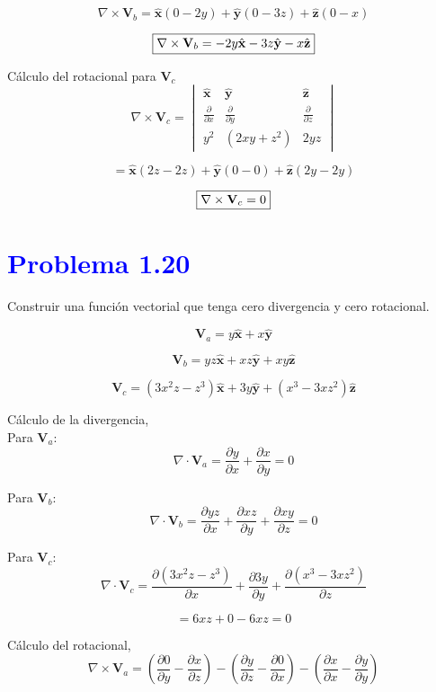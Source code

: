\documentclass[12pt]{article}
\newcommand{\question}[1]{\textcolor{blue}{\textbf{#1}}}
\begin{document}
\[
\nabla \times \mathbf{V}_b =
\hat{\mathbf{x}} (0 - 2y) +
\hat{\mathbf{y}} (0 - 3z) +
\hat{\mathbf{z}} (0 - x)
\]

\[\fbox{$
\nabla \times \mathbf{V}_b = -2y \hat{\mathbf{x}} - 3z \hat{\mathbf{y}} - x \hat{\mathbf{z}}$}
\]

Cálculo del rotacional para $\mathbf{V}_c$
\[
\nabla \times \mathbf{V}_c =
\begin{vmatrix}
\hat{\mathbf{x}} & \hat{\mathbf{y}} & \hat{\mathbf{z}} \\
\frac{\partial}{\partial x} & \frac{\partial}{\partial y} & \frac{\partial}{\partial z} \\
y^2 & (2xy+z^2) & 2yz
\end{vmatrix}
\]

\[
= \hat{\mathbf{x}} (2z - 2z) + \hat{\mathbf{y}} (0 - 0) + \hat{\mathbf{z}} (2y - 2y) \]

\[\fbox{$
\nabla \times \mathbf{V}_c=0$}
\]

\section*{ \question{Problema 1.20}}  Construir una función vectorial que tenga cero divergencia y cero rotacional.

\[
\mathbf{V}_a = y \hat{\mathbf{x}} + x \hat{\mathbf{y}}
\]

\[
\mathbf{V}_b = yz \hat{\mathbf{x}} + xz \hat{\mathbf{y}} + xy \hat{\mathbf{z}}
\]

\[
\mathbf{V}_c = (3x^2z - z^3) \hat{\mathbf{x}} + 3y \hat{\mathbf{y}} + (x^3 - 3xz^2) \hat{\mathbf{z}}
\]

Cálculo de la divergencia,\\

Para $\mathbf{V}_a$:
\[
\nabla \cdot \mathbf{V}_a = \frac{\partial y}{\partial x} + \frac{\partial x}{\partial y}  = 0
\]

Para $\mathbf{V}_b$:
\[
\nabla \cdot \mathbf{V}_b = \frac{\partial yz}{\partial x} + \frac{\partial xz}{\partial y} + \frac{\partial xy}{\partial z} = 0
\]

Para $\mathbf{V}_c$:
\[
\nabla \cdot \mathbf{V}_c = \frac{\partial (3x^2z - z^3)}{\partial x} + \frac{\partial 3y}{\partial y} + \frac{\partial (x^3 - 3xz^2)}{\partial z}
\]

\[= 6xz + 0 - 6xz = 0\]

Cálculo del rotacional,\\

\[
\nabla \times \mathbf{V}_a = \left( \frac{\partial 0}{\partial y} - \frac{\partial x}{\partial z} \right) - \left( \frac{\partial y}{\partial z} - \frac{\partial 0}{\partial x} \right) - \left( \frac{\partial x}{\partial x} - \frac{\partial y}{\partial y} \right)
\]
\end{document}
